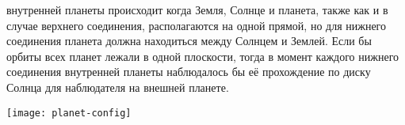 \begin{minipage}{0.36\tw}
 внутренней планеты происходит когда Земля, Солнце и планета, также как и в случае верхнего соединения, располагаются на одной прямой, но для нижнего соединения планета должна находиться между Солнцем и Землей. Если бы орбиты всех планет лежали в одной плоскости, тогда в момент каждого нижнего соединения внутренней планеты наблюдалось бы её прохождение по диску Солнца для наблюдателя на внешней планете.
\end{minipage}
\begin{minipage}{0.63\tw}
	\centering
	\vspace{-1pc}
	\texttt{[image: planet-config]}
%
%
%  
%
%
%    
%    
%
%

\end{minipage}
